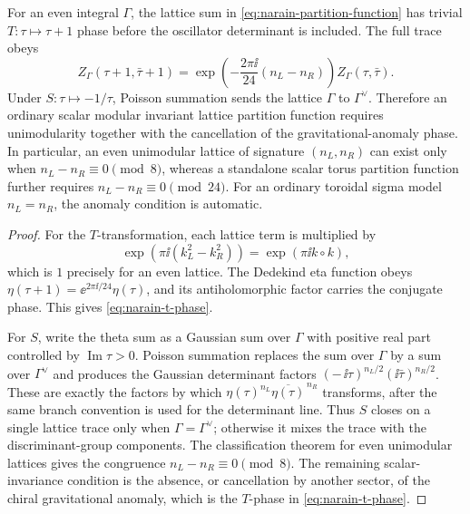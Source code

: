 \begin{lemma}
\label{lem:narain-modular-behavior}
For an even integral \(\Gamma\), the lattice sum in
\eqref{eq:narain-partition-function} has trivial \(T:\tau\mapsto\tau+1\)
phase before the oscillator determinant is included.  The full trace obeys
\begin{equation}
  Z_\Gamma(\tau+1,\bar\tau+1)
  =
  \exp\!\left(-\frac{2\pi\ii}{24}(n_L-n_R)\right)
  Z_\Gamma(\tau,\bar\tau).
  \label{eq:narain-t-phase}
\end{equation}
Under \(S:\tau\mapsto-1/\tau\), Poisson summation sends the lattice
\(\Gamma\) to \(\Gamma^\vee\).  Therefore an ordinary scalar modular
invariant lattice partition function requires unimodularity together with
the cancellation of the gravitational-anomaly phase.  In particular, an
even unimodular lattice of signature \((n_L,n_R)\) can exist only when
\(n_L-n_R\equiv0\pmod8\), whereas a standalone scalar torus partition
function further requires \(n_L-n_R\equiv0\pmod{24}\).  For an ordinary
toroidal sigma model \(n_L=n_R\), the anomaly condition is automatic.
\end{lemma}

\begin{proof}
For the \(T\)-transformation, each lattice term is multiplied by
\[
  \exp\!\left(\pi\ii(k_L^2-k_R^2)\right)
  =
  \exp(\pi\ii k\circ k),
\]
which is \(1\) precisely for an even lattice.  The Dedekind eta function
obeys \(\eta(\tau+1)=\ee^{2\pi\ii/24}\eta(\tau)\), and its antiholomorphic
factor carries the conjugate phase.  This gives
\eqref{eq:narain-t-phase}.

For \(S\), write the theta sum as a Gaussian sum over \(\Gamma\) with
positive real part controlled by \(\operatorname{Im}\tau>0\).  Poisson
summation replaces the sum over \(\Gamma\) by a sum over \(\Gamma^\vee\) and
produces the Gaussian determinant factors
\((-\,\ii\tau)^{n_L/2}(\ii\bar\tau)^{n_R/2}\).  These are exactly the factors
by which \(\eta(\tau)^{n_L}\overline{\eta(\tau)}^{\,n_R}\) transforms, after
the same branch convention is used for the determinant line.  Thus \(S\)
closes on a single lattice trace only when \(\Gamma=\Gamma^\vee\); otherwise
it mixes the trace with the discriminant-group components.  The
classification theorem for even unimodular lattices gives the congruence
\(n_L-n_R\equiv0\pmod8\).  The remaining scalar-invariance condition is the
absence, or cancellation by another sector, of the chiral gravitational
anomaly, which is the \(T\)-phase in \eqref{eq:narain-t-phase}.
\end{proof}

